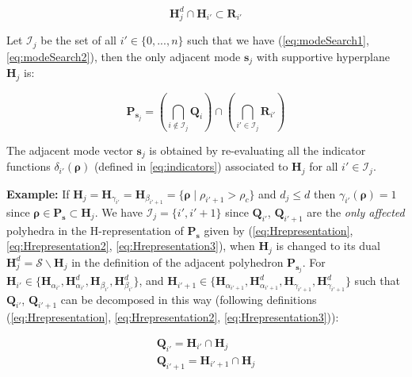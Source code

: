 \documentclass[11pt]{article}
\numberwithin{equation}{section}
\numberwithin{figure}{section}
\numberwithin{table}{section}
\begin{document}
\begin{equation}
\textbf{H}^{d}_{j}\cap \textbf{H}_{i'}\subset \textbf{R}_{i'}
\label{eq:modeSearch2}
\end{equation}

\noindent Let $\mathcal{I}_{j}$ be the set of all $i'\in\{0,...,n\}$ such that we have (\ref{eq:modeSearch1}, \ref{eq:modeSearch2}), then the only adjacent mode $\boldsymbol s_{j}$ with supportive hyperplane $\textbf{H}_{j}$ is: 

\begin{equation}
\textbf{P}_{\boldsymbol s_{j}}=(\bigcap_{i\notin \mathcal{I}_{j}} \textbf{Q}_{i})\cap (\bigcap_{i'\in\mathcal{I}_{j}}\textbf{R}_{i'})
\label{eq:modeSearch3}
\end{equation}

\noindent The adjacent mode vector $\boldsymbol s_{j}$ is obtained by re-evaluating all the indicator functions $\delta_{i'}(\boldsymbol\rho)$ (defined in \ref{eq:indicators}) associated to $\textbf{H}_{j}$ for all $i'\in\mathcal{I}_{j}$.

\hspace{10mm}

\noindent\textbf{Example: }If $\textbf{H}_{j}=\textbf{H}_{\gamma_{i'}}=\textbf{H}_{\beta_{i'+1}}=\{\boldsymbol\rho\mid\rho_{i'+1}>\rho_{c}\}$ and $d_{j}\leq d$ then $\gamma_{i'}(\boldsymbol \rho)=1$ since $\boldsymbol\rho\in\textbf{P}_{\boldsymbol s}\subset\textbf{H}_{j}$. We have $\mathcal{I}_{j}=\{i',i'+1\}$ since $\textbf{Q}_{i'}$, $\textbf{Q}_{i'+1}$ are the \textit{only affected} polyhedra in the H-representation of $\textbf{P}_{\boldsymbol s}$ given by (\ref{eq:Hrepresentation}, \ref{eq:Hrepresentation2}, \ref{eq:Hrepresentation3}), when $\textbf{H}_{j}$ is changed to its dual $\textbf{H}^{d}_{j}=\mathcal{S}\backslash \textbf{H}_{j}$ in the definition of the adjacent polyhedron $\textbf{P}_{\boldsymbol s_{j}}$. For $\textbf{H}_{i'}\in\{\textbf{H}_{\alpha_{i'}}, \textbf{H}^{d}_{\alpha_{i'}}, \textbf{H}_{\beta_{i'}}, \textbf{H}^{d}_{\beta_{i'}}\}$, and $\textbf{H}_{i'+1}\in\{\textbf{H}_{\alpha_{i'+1}}, \textbf{H}^{d}_{\alpha_{i'+1}}, \textbf{H}_{\gamma_{i'+1}}, \textbf{H}^{d}_{\gamma_{i'+1}}\}$ such that $\textbf{Q}_{i'}$, $\textbf{Q}_{i'+1}$ can be decomposed in this way (following definitions (\ref{eq:Hrepresentation}, \ref{eq:Hrepresentation2}, \ref{eq:Hrepresentation3})):

\begin{equation}
\begin{array}{l}
\textbf{Q}_{i'}=\textbf{H}_{i'}\cap\textbf{H}_{j}\\
\textbf{Q}_{i'+1}=\textbf{H}_{i'+1}\cap\textbf{H}_{j}
\end{array}
\label{eq:modeSearch4}
\end{equation}
\end{document}
